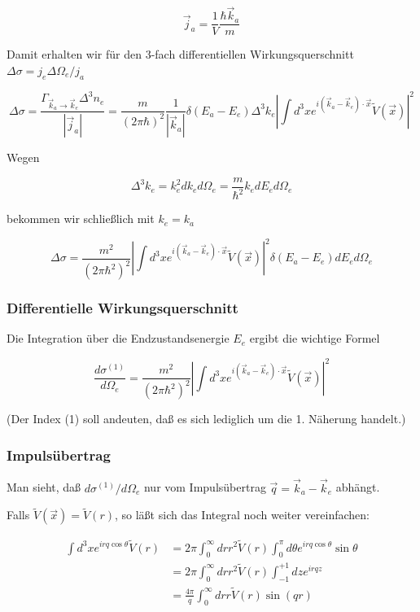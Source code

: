 \documentclass[10pt, letterpaper]{article}
\begin{document}
$$
\vec{j}_{a}=\frac{1}{V} \frac{\hbar \vec{k}_{a}}{m}
$$

Damit erhalten wir für den 3-fach differentiellen Wirkungsquerschnitt $\Delta \sigma=j_{e} \Delta \Omega_{e} / j_{a}$

$$
\Delta \sigma=\frac{\Gamma_{\vec{k}_{a} \rightarrow \vec{k}_{e}} \Delta^{3} n_{e}}{\left|\vec{j}_{a}\right|}=\frac{m}{(2 \pi \hbar)^{2}} \frac{1}{\left|\vec{k}_{a}\right|} \delta\left(E_{a}-E_{e}\right) \Delta^{3} k_{e}\left|\int d^{3} x e^{i\left(\vec{k}_{a}-\vec{k}_{e}\right) \cdot \vec{x}} \tilde{V}(\vec{x})\right|^{2}
$$

Wegen

$$
\Delta^{3} k_{e}=k_{e}^{2} d k_{e} d \Omega_{e}=\frac{m}{\hbar^{2}} k_{e} d E_{e} d \Omega_{e}
$$

bekommen wir schließlich mit $k_{e}=k_{a}$

$$
\Delta \sigma=\frac{m^{2}}{\left(2 \pi \hbar^{2}\right)^{2}}\left|\int d^{3} x e^{i\left(\vec{k}_{a}-\vec{k}_{e}\right) \cdot \vec{x}} \tilde{V}(\vec{x})\right|^{2} \delta\left(E_{a}-E_{e}\right) d E_{e} d \Omega_{e}
$$

\subsubsection*{Differentielle Wirkungsquerschnitt}
Die Integration über die Endzustandsenergie $E_{e}$ ergibt die wichtige Formel

$$
\frac{d \sigma^{(1)}}{d \Omega_{e}}=\frac{m^{2}}{\left(2 \pi \hbar^{2}\right)^{2}}\left|\int d^{3} x e^{i\left(\vec{k}_{a}-\vec{k}_{e}\right) \cdot \vec{x}} \tilde{V}(\vec{x})\right|^{2}
$$

(Der Index (1) soll andeuten, daß es sich lediglich um die 1. Näherung handelt.)

\subsubsection*{Impulsübertrag}
Man sieht, daß $d \sigma^{(1)} / d \Omega_{e}$ nur vom Impulsübertrag $\vec{q}=\vec{k}_{a}-\vec{k}_{e}$ abhängt.

Falls $\tilde{V}(\vec{x})=\tilde{V}(r)$, so läßt sich das Integral noch weiter vereinfachen:

$$
\begin{aligned}
\int d^{3} x e^{i r q \cos \theta} \tilde{V}(r) & =2 \pi \int_{0}^{\infty} d r r^{2} \tilde{V}(r) \int_{0}^{\pi} d \theta e^{i r q \cos \theta} \sin \theta \\
& =2 \pi \int_{0}^{\infty} d r r^{2} \tilde{V}(r) \int_{-1}^{+1} d z e^{i r q z} \\
& =\frac{4 \pi}{q} \int_{0}^{\infty} d r r \tilde{V}(r) \sin (q r)
\end{aligned}
$$
\end{document}
